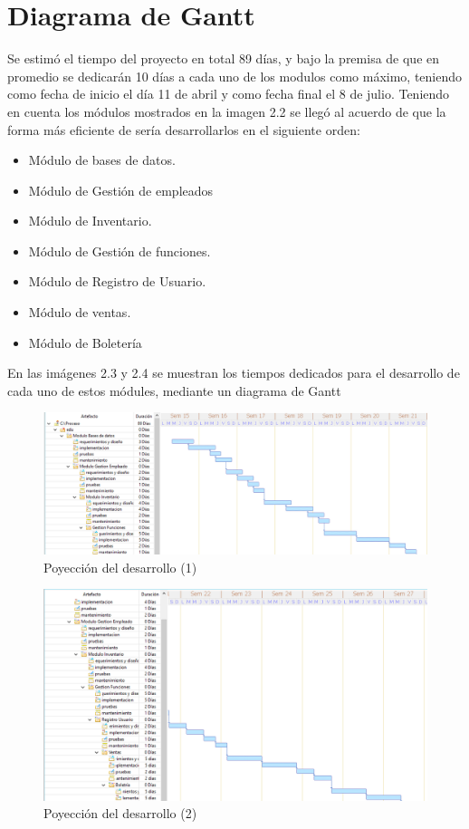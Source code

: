 \section{Diagrama de Gantt}
Se estimó el tiempo del proyecto en total 89 días, y bajo la premisa de que en promedio se dedicarán 10 días a cada uno de los modulos como máximo, teniendo como fecha de inicio el día 11 de abril y como fecha final el 8 de julio.
Teniendo en cuenta los módulos mostrados en la imagen 2.2 se llegó al acuerdo de que la forma más eficiente de sería desarrollarlos en el siguiente orden:
\begin{itemize}
	\item Módulo de bases de datos.
	\item Módulo de Gestión de empleados
	\item Módulo de Inventario.
	\item Módulo de Gestión de funciones.
	\item Módulo de Registro de Usuario.
	\item Módulo de ventas.
	\item Módulo de Boletería
\end{itemize}

En las imágenes 2.3 y 2.4 se muestran los tiempos dedicados para el desarrollo de cada uno de estos módules, mediante un diagrama de Gantt
\begin{figure}[h!]
	\centering
\includegraphics[width=1\linewidth]{proyecto/proceso/imgs/modulo1}
	\caption{Poyección del desarrollo (1)}
\end{figure}
\begin{figure}[h!]
	\centering
\includegraphics[width=0.9\linewidth]{proyecto/proceso/imgs/modulo2}
	\caption{Poyección del desarrollo (2)}
\end{figure}

